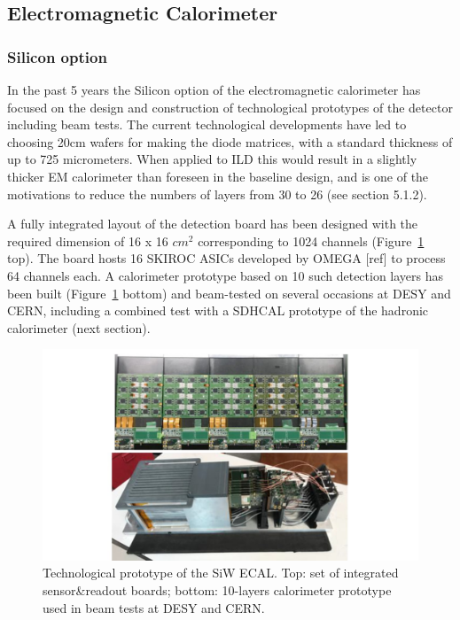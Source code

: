 \subsection{Electromagnetic Calorimeter}

\subsubsection{Silicon option}

In the past 5 years the Silicon option of the electromagnetic calorimeter has focused on the design and construction of technological prototypes of the detector including beam tests. The current technological developments have led to choosing 20cm wafers for making the diode matrices, with a standard thickness of up to 725 micrometers. When applied to ILD this would result in a slightly thicker EM calorimeter than foreseen in the baseline design, and is one of the motivations to reduce the numbers of layers from 30 to 26 (see section 5.1.2).

A fully integrated layout of the detection board has been designed with the required dimension of 16 x 16 $cm^2$ corresponding to 1024 channels (Figure~\ref{fig:det:SiWECAL_proto} top). The board hosts 16 SKIROC ASICs developed by OMEGA [ref] to process 64 channels each. A calorimeter prototype based on 10 such detection layers has been built (Figure~\ref{fig:det:SiWECAL_proto} bottom) and beam-tested on several occasions at DESY and CERN, including a combined test with a SDHCAL prototype of the hadronic calorimeter (next section).   
\begin{figure}[t!]
\centering
\includegraphics[width=1.0\hsize]{Detector/fig/SiWECAL_proto.jpg}
\caption{Technological prototype of the SiW ECAL. Top: set of integrated sensor\&readout boards; bottom: 10-layers calorimeter prototype used in beam tests at DESY and CERN.}
\label{fig:det:SiWECAL_proto}
\end{figure}

